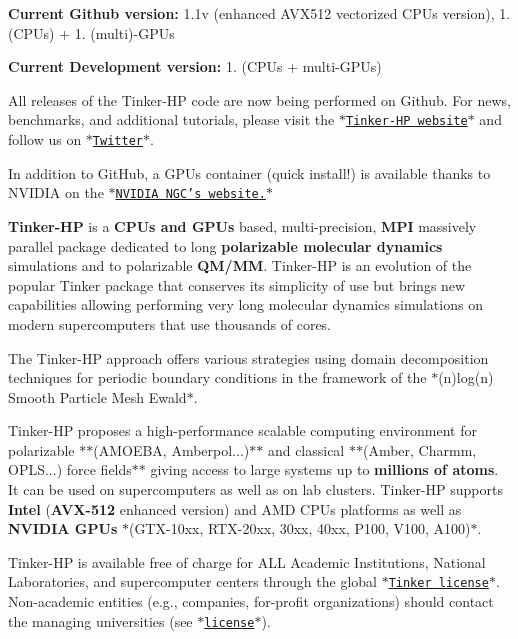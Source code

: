 \begin{DoxyItemize}
\item {\bfseries Current Github version\-:} 1.\-1v (enhanced A\-V\-X512 vectorized C\-P\-Us version), 1. (C\-P\-Us) + 1. (multi)-\/\-G\-P\-Us
\item {\bfseries Current Development version\-:} 1. (C\-P\-Us + multi-\/\-G\-P\-Us)
\end{DoxyItemize}

All releases of the Tinker-\/\-H\-P code are now being performed on Github. For news, benchmarks, and additional tutorials, please visit the \href{https://tinker-hp.org/}{\tt $\ast$\-Tinker-\/\-H\-P website$\ast$} and follow us on \href{https://twitter.com/TINKERtoolsMD}{\tt $\ast$\-Twitter$\ast$}.

In addition to Git\-Hub, a G\-P\-Us container (quick install!) is available thanks to N\-V\-I\-D\-I\-A on the \href{https://ngc.nvidia.com/catalog/containers/hpc:tinkerhp}{\tt $\ast$\-N\-V\-I\-D\-I\-A N\-G\-C's website.$\ast$} 



{\bfseries Tinker-\/\-H\-P} is a {\bfseries C\-P\-Us and G\-P\-Us} based, multi-\/precision, {\bfseries M\-P\-I} massively parallel package dedicated to long {\bfseries polarizable molecular dynamics} simulations and to polarizable {\bfseries Q\-M/\-M\-M}. Tinker-\/\-H\-P is an evolution of the popular Tinker package that conserves its simplicity of use but brings new capabilities allowing performing very long molecular dynamics simulations on modern supercomputers that use thousands of cores.

The Tinker-\/\-H\-P approach offers various strategies using domain decomposition techniques for periodic boundary conditions in the framework of the $\ast$(n)log(n) Smooth Particle Mesh Ewald$\ast$.

Tinker-\/\-H\-P proposes a high-\/performance scalable computing environment for polarizable $\ast$$\ast$(A\-M\-O\-E\-B\-A, Amberpol...)$\ast$$\ast$ and classical $\ast$$\ast$(Amber, Charmm, O\-P\-L\-S...) force fields$\ast$$\ast$ giving access to large systems up to {\bfseries millions of atoms}. It can be used on supercomputers as well as on lab clusters. Tinker-\/\-H\-P supports {\bfseries Intel} ({\bfseries A\-V\-X-\/512} enhanced version) and A\-M\-D C\-P\-Us platforms as well as {\bfseries N\-V\-I\-D\-I\-A G\-P\-Us} $\ast$(G\-T\-X-\/10xx, R\-T\-X-\/20xx, 30xx, 40xx, P100, V100, A100)$\ast$. 



Tinker-\/\-H\-P is available free of charge for A\-L\-L Academic Institutions, National Laboratories, and supercomputer centers through the global \href{https://dasher.wustl.edu/tinker/downloads/license.pdf}{\tt $\ast$\-Tinker license$\ast$}. Non-\/academic entities (e.\-g., companies, for-\/profit organizations) should contact the managing universities (see \href{license-Tinker.pdf}{\tt $\ast$license$\ast$}). 





